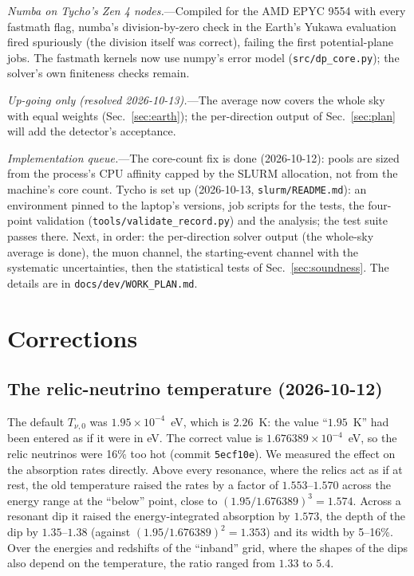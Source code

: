 \documentclass[11pt,a4paper]{article}
\newcommand{\file}[1]{\nolinkurl{#1}}
\newcommand{\Tnu}{T_{\nu,0}}
\begin{document}
\textit{Numba on Tycho's Zen 4 nodes.}---Compiled for the AMD EPYC 9554 with every fastmath flag,
numba's division-by-zero check in the Earth's Yukawa evaluation fired spuriously (the division
itself was correct), failing the first potential-plane jobs. The fastmath kernels now use numpy's
error model (\file{src/dp\_core.py}); the solver's own finiteness checks remain.

\textit{Up-going only (resolved 2026-10-13).}---The average now covers the whole sky with equal
weights (Sec.~\ref{sec:earth}); the per-direction output of Sec.~\ref{sec:plan} will add the
detector's acceptance.

\textit{Implementation queue.}---The core-count fix is done (2026-10-12): pools are sized from the
process's CPU affinity capped by the SLURM allocation, not from the machine's core count. Tycho
is set up (2026-10-13, \file{slurm/README.md}): an environment pinned to the laptop's versions,
job scripts for the tests, the four-point validation (\file{tools/validate\_record.py}) and the
analysis; the test suite passes there. Next, in order: the per-direction solver output (the
whole-sky average is done), the muon channel, the starting-event channel with the systematic
uncertainties, then the statistical tests of Sec.~\ref{sec:soundness}. The details are in
\file{docs/dev/WORK_PLAN.md}.

\appendix
\section{Corrections}
\label{app:corrections}

\subsection{The relic-neutrino temperature (2026-10-12)}
\label{app:tnu}

The default $\Tnu$ was $1.95\times10^{-4}$~eV, which is $2.26$~K: the value ``$1.95$~K'' had
been entered as if it were in eV. The correct value is $1.676389\times10^{-4}$~eV, so the
relic neutrinos were 16\% too hot (commit \texttt{5ecf10e}). We measured the effect on the
absorption rates directly. Above every resonance, where the relics act as if at rest, the old
temperature raised the rates by a factor of $1.553$--$1.570$ across the energy range at the
``below'' point, close to $(1.95/1.676389)^3 = 1.574$. Across a resonant dip it raised the
energy-integrated absorption by $1.573$, the depth of the dip by $1.35$--$1.38$
(against $(1.95/1.676389)^2 = 1.353$) and its width by 5--16\%. Over the energies and redshifts
of the ``inband'' grid, where the shapes of the dips also depend on the temperature, the ratio
ranged from $1.33$ to $5.4$.
\end{document}
